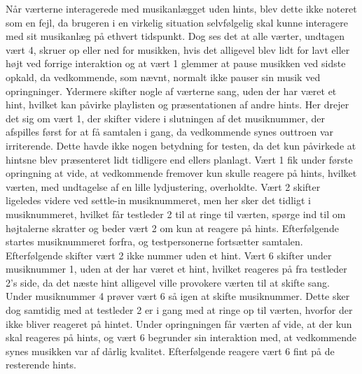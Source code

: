 Når værterne interagerede med musikanlægget uden hints, blev dette ikke noteret som en fejl, da brugeren i en virkelig situation selvfølgelig skal kunne interagere med sit musikanlæg på ethvert tidspunkt. Dog ses det at alle værter, undtagen vært 4, skruer op eller ned for musikken, hvis det alligevel blev lidt for lavt eller højt ved forrige interaktion og at vært 1 glemmer at pause musikken ved sidste opkald, da vedkommende, som nævnt, normalt ikke pauser sin musik ved opringninger. Ydermere skifter nogle af værterne sang, uden der har været et hint, hvilket kan påvirke playlisten og præsentationen af andre hints. Her drejer det sig om vært 1, der skifter videre i slutningen af det musiknummer, der afspilles først for at få samtalen i gang, da vedkommende synes outtroen var irriterende. Dette havde ikke nogen betydning for testen, da det kun påvirkede at hintsne blev præsenteret lidt tidligere end ellers planlagt. Vært 1 fik under første opringning at vide, at vedkommende fremover kun skulle reagere på hints, hvilket værten, med undtagelse af en lille lydjustering, overholdte. Vært 2 skifter ligeledes videre ved settle-in musiknummeret, men her sker det tidligt i musiknummeret, hvilket får testleder 2 til at ringe til værten, spørge ind til om højtalerne skratter og beder vært 2 om kun at reagere på hints. Efterfølgende startes musiknummeret forfra, og testpersonerne fortsætter samtalen. Efterfølgende skifter vært 2 ikke nummer uden et hint. Vært 6 skifter under musiknummer 1, uden at der har været et hint, hvilket reageres på fra testleder 2's side, da det næste hint alligevel ville provokere værten til at skifte sang. Under musiknummer 4 prøver vært 6 så igen at skifte musiknummer. Dette sker dog samtidig med at testleder 2 er i gang med at ringe op til værten, hvorfor der ikke bliver reageret på hintet. Under opringningen får værten af vide, at der kun skal reageres på hints, og vært 6 begrunder sin interaktion med, at vedkommende synes musikken var af dårlig kvalitet. Efterfølgende reagere vært 6 fint på de resterende hints. 

